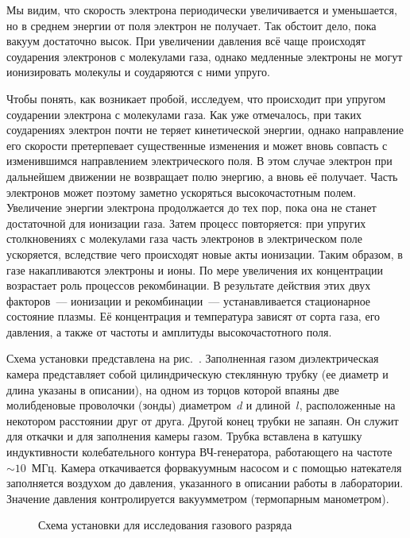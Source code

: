 Мы видим, что скорость электрона периодически увеличивается и уменьшается, но в
среднем энергии от поля электрон не
получает. Так обстоит дело, пока вакуум достаточно высок. При увеличении
давления всё чаще происходят соударения
электронов с молекулами газа, однако медленные электроны не могут ионизировать
молекулы и соударяются с ними упруго.

Чтобы понять, как возникает пробой, исследуем, что происходит при упругом
соударении электрона с молекулами газа. Как уже отмечалось, при таких
соударениях электрон почти не теряет кинетической энергии, однако направление
его скорости претерпевает существенные изменения и может вновь совпасть с
изменившимся направлением электрического поля. В этом случае электрон при
дальнейшем движении не возвращает полю энергию, а вновь её получает. Часть
электронов может поэтому заметно ускоряться высокочастотным полем. Увеличение
энергии электрона продолжается до тех пор, пока она не станет достаточной для
ионизации газа. Затем процесс повторяется: при упругих столкновениях с
молекулами газа часть электронов
в электрическом поле ускоряется, вследствие чего происходят новые акты
ионизации. Таким образом, в газе накапливаются электроны и ионы. По мере
увеличения их концентрации возрастает роль процессов рекомбинации. В результате
действия этих двух факторов~--- ионизации и рекомбинации~---
устанавливается стационарное состояние плазмы.
Её концентрация и температура зависят от сорта газа, его давления,
а также от частоты и амплитуды высокочастотного поля.

\experiment
Схема установки представлена на рис.~.
Заполненная газом диэлектрическая камера представляет собой цилиндрическую
стеклянную трубку (ее диаметр и длина указаны в описании), на одном из торцов
которой впаяны две молибденовые проволочки (зонды)
диаметром~$d$ и длиной~$l$, расположенные на некотором расстоянии друг от друга.
Другой конец трубки не запаян.
Он служит для откачки и для заполнения камеры газом. Трубка вставлена в катушку
индуктивности колебательного контура
ВЧ-генератора, работающего на частоте~$\sim10$~МГц. Камера откачивается
форвакуумным насосом и с помощью натекателя
заполняется воздухом до давления, указанного в описании работы в лаборатории.
Значение давления контролируется вакуумметром
(термопарным манометром).

\begin{figure}[h!]
    \centering
	\caption{Схема установки для исследования газового разряда}
\end{figure}

